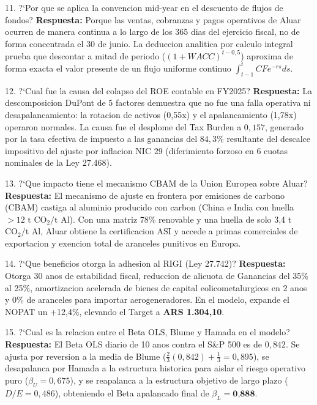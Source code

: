 \documentclass[10pt,a4paper]{article}
\theoremstyle{definition}
\begin{document}
\begin{examquestion}{11. ?`Por que se aplica la convencion mid-year en el descuento de flujos de fondos?}
\textbf{Respuesta:} Porque las ventas, cobranzas y pagos operativos de Aluar ocurren de manera continua a lo largo de los 365 dias del ejercicio fiscal, no de forma concentrada el 30 de junio. La deduccion analitica por calculo integral prueba que descontar a mitad de periodo ($(1+WACC)^{t-0,5}$) aproxima de forma exacta el valor presente de un flujo uniforme continuo $\int_{t-1}^t CF e^{-rs}ds$.
\end{examquestion}

\begin{examquestion}{12. ?`Cual fue la causa del colapso del ROE contable en FY2025?}
\textbf{Respuesta:} La descomposicion DuPont de 5 factores demuestra que no fue una falla operativa ni desapalancamiento: la rotacion de activos (0,55x) y el apalancamiento (1,78x) operaron normales. La causa fue el desplome del Tax Burden a $0,157$, generado por la tasa efectiva de impuesto a las ganancias del $84,3\%$ resultante del descalce impositivo del ajuste por inflacion NIC 29 (diferimiento forzoso en 6 cuotas nominales de la Ley 27.468).
\end{examquestion}

\begin{examquestion}{13. ?`Que impacto tiene el mecanismo CBAM de la Union Europea sobre Aluar?}
\textbf{Respuesta:} El mecanismo de ajuste en frontera por emisiones de carbono (CBAM) castiga al aluminio producido con carbon (China e India con huella $>12\text{ t }\text{CO}_2/\text{t Al}$). Con una matriz 78\% renovable y una huella de solo 3,4 t $\text{CO}_2/\text{t Al}$, Aluar obtiene la certificacion ASI y accede a primas comerciales de exportacion y exencion total de aranceles punitivos en Europa.
\end{examquestion}

\begin{examquestion}{14. ?`Que beneficios otorga la adhesion al RIGI (Ley 27.742)?}
\textbf{Respuesta:} Otorga 30 anos de estabilidad fiscal, reduccion de alicuota de Ganancias del 35\% al 25\%, amortizacion acelerada de bienes de capital eolicometalurgicos en 2 anos y 0\% de aranceles para importar aerogeneradores. En el modelo, expande el NOPAT un +12,4\%, elevando el Target a \textbf{ARS 1.304,10}.
\end{examquestion}

\begin{examquestion}{15. ?`Cual es la relacion entre el Beta OLS, Blume y Hamada en el modelo?}
\textbf{Respuesta:} El Beta OLS diario de 10 anos contra el S\&P 500 es de $0,842$. Se ajusta por reversion a la media de Blume ($\frac{2}{3}(0,842) + \frac{1}{3} = 0,895$), se desapalanca por Hamada a la estructura historica para aislar el riesgo operativo puro ($\beta_U = 0,675$), y se reapalanca a la estructura objetivo de largo plazo ($D/E = 0,486$), obteniendo el Beta apalancado final de $\beta_L = \textbf{0,888}$.
\end{examquestion}
\end{document}
